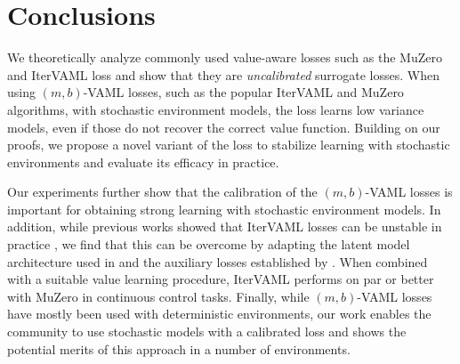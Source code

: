 \section{Conclusions}


We theoretically analyze commonly used value-aware losses such as the MuZero and IterVAML loss and show that they are \emph{uncalibrated} surrogate losses.
When using $(m,b)$-VAML losses, such as the popular IterVAML and MuZero algorithms, with stochastic environment models, the loss learns low variance models, even if those do not recover the correct value function.
Building on our proofs, we propose a novel variant of the loss to stabilize learning with stochastic environments and evaluate its efficacy in practice.

Our experiments further show that the calibration of the $(m,b)$-VAML losses is important for obtaining strong learning with stochastic environment models.
In addition, while previous works showed that IterVAML losses can be unstable in practice \parencite{lovatto2020decision,voelcker2022value}, we find that this can be overcome by adapting the latent model architecture used in \textcite{schrittwieser2020mastering} and the auxiliary losses established by \textcite{li2023efficient,hansen2022temporal}.
When combined with a suitable value learning procedure, IterVAML performs on par or better with MuZero in continuous control tasks.
Finally, while $(m,b)$-VAML losses have mostly been used with deterministic environments, our work enables the community to use stochastic models with a calibrated loss and shows the potential merits of this approach in a number of environments.
